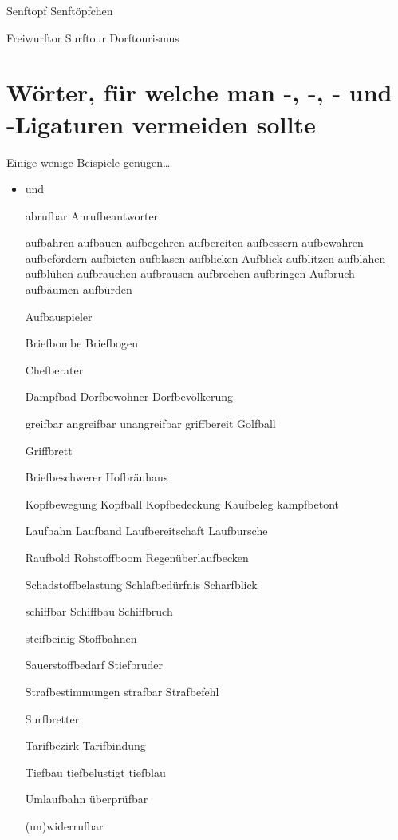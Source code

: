 Senftopf Senftöpfchen

Freiwurftor Surftour Dorftourismus

\ebg

\section*{Wörter, für welche man -, -, - und -Ligaturen vermeiden sollte}

Einige wenige Beispiele genügen\ldots



\begin{itemize}


\item {} und 


abrufbar 
Anrufbeantworter 

aufbahren aufbauen aufbegehren aufbereiten aufbessern aufbewahren aufbefördern aufbieten aufblasen aufblicken Aufblick aufblitzen aufblähen aufblühen aufbrauchen aufbrausen aufbrechen aufbringen Aufbruch aufbäumen aufbürden 

Aufbauspieler 

Briefbombe Briefbogen 

Chefberater 

Dampfbad Dorfbewohner Dorfbevölkerung

greifbar angreifbar unangreifbar griffbereit Golfball 

Griffbrett

Briefbeschwerer Hofbräuhaus 

Kopfbewegung Kopfball Kopfbedeckung Kaufbeleg kampfbetont 

Laufbahn Laufband Laufbereitschaft Laufbursche 

Raufbold Rohstoffboom Regenüberlaufbecken

Schadstoffbelastung Schlafbedürfnis Scharfblick 

schiffbar Schiffbau Schiffbruch 

steifbeinig Stoffbahnen

Sauerstoffbedarf Stiefbruder 

Strafbestimmungen strafbar Strafbefehl

Surfbretter

Tarifbezirk Tarifbindung 

Tiefbau tiefbelustigt tiefblau 

Umlaufbahn überprüfbar

(un)widerrufbar


\end{itemize}
